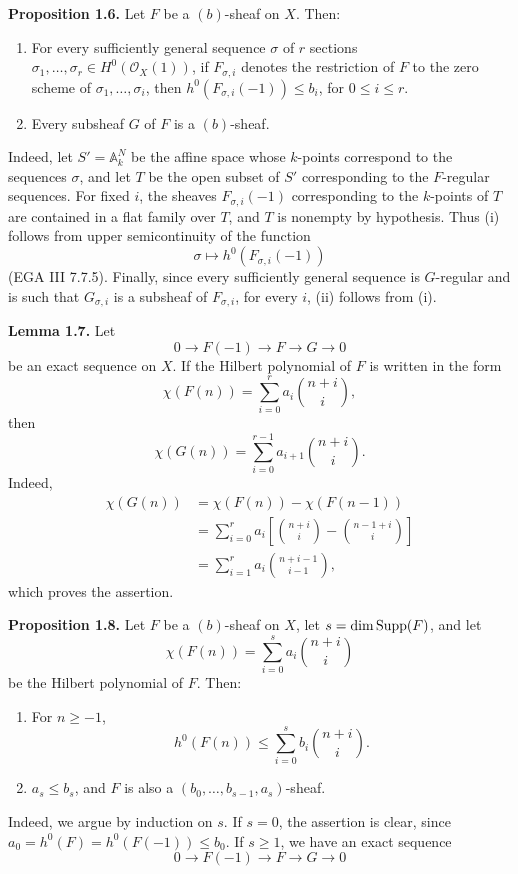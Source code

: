 \textbf{Proposition 1.6.} Let \(F\) be a \((b)\)-sheaf on \(X\). Then:
\begin{enumerate}[label=(\roman*)]
\item For every sufficiently general sequence \(\sigma\) of \(r\) sections
\(\sigma_1,\ldots,\sigma_r\in H^0(\mathcal O_X(1))\), if
\(F_{\sigma,i}\) denotes the restriction of \(F\) to the zero scheme of
\(\sigma_1,\ldots,\sigma_i\), then
\(h^0(F_{\sigma,i}(-1))\leq b_i\), for \(0\leq i\leq r\).
\item Every subsheaf \(G\) of \(F\) is a \((b)\)-sheaf.
\end{enumerate}

\newpage
Indeed, let \(S'=\mathbb A_k^N\) be the affine space whose \(k\)-points
correspond to the sequences \(\sigma\), and let \(T\) be the open subset of
\(S'\) corresponding to the \(F\)-regular sequences. For fixed \(i\), the
sheaves \(F_{\sigma,i}(-1)\) corresponding to the \(k\)-points of \(T\) are
contained in a flat family over \(T\), and \(T\) is nonempty by hypothesis.
Thus (i) follows from upper semicontinuity of the function
\[
  \sigma\longmapsto h^0(F_{\sigma,i}(-1))
\]
(EGA III 7.7.5). Finally, since every sufficiently general sequence is
\(G\)-regular and is such that \(G_{\sigma,i}\) is a subsheaf of
\(F_{\sigma,i}\), for every \(i\), (ii) follows from (i).

\textbf{Lemma 1.7.} Let
\[
  0\longrightarrow F(-1)\longrightarrow F\longrightarrow G\longrightarrow0
\]
be an exact sequence on \(X\). If the Hilbert polynomial of \(F\) is written
in the form
\[
  \chi(F(n))=\sum_{i=0}^{r}a_i\binom{n+i}{i},
\]
then
\[
  \chi(G(n))=\sum_{i=0}^{r-1}a_{i+1}\binom{n+i}{i}.
\]
Indeed,
\[
\begin{aligned}
  \chi(G(n))
  &=\chi(F(n))-\chi(F(n-1))\\
  &=\sum_{i=0}^{r}a_i
    \left[\binom{n+i}{i}-\binom{n-1+i}{i}\right]\\
  &=\sum_{i=1}^{r}a_i\binom{n+i-1}{i-1},
\end{aligned}
\]
which proves the assertion.

\textbf{Proposition 1.8.} Let \(F\) be a \((b)\)-sheaf on \(X\), let
\(s=\dim\operatorname{Supp}(F)\), and let
\[
  \chi(F(n))=\sum_{i=0}^{s}a_i\binom{n+i}{i}
\]
be the Hilbert polynomial of \(F\). Then:
\begin{enumerate}[label=(\roman*)]
\item For \(n\geq-1\),
\[
  h^0(F(n))\leq\sum_{i=0}^{s}b_i\binom{n+i}{i}.
\]
\item \(a_s\leq b_s\), and \(F\) is also a
\((b_0,\ldots,b_{s-1},a_s)\)-sheaf.
\end{enumerate}
Indeed, we argue by induction on \(s\). If \(s=0\), the assertion is clear,
since \(a_0=h^0(F)=h^0(F(-1))\leq b_0\). If \(s\geq1\), we have an exact
sequence
\[
  0\longrightarrow F(-1)\longrightarrow F\longrightarrow G\longrightarrow0
\]


